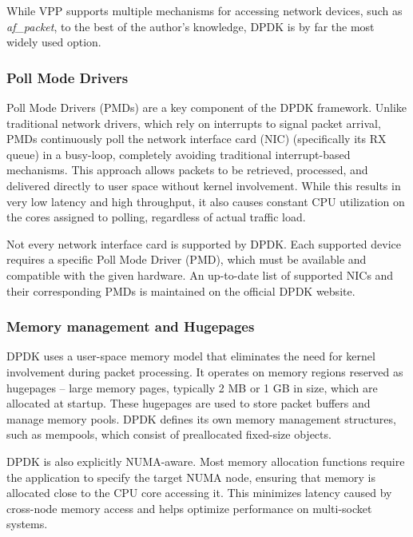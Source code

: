 While VPP supports multiple mechanisms for accessing network devices, such as \textit{af\_packet}, to the best of the author's knowledge, DPDK is by far the most widely used option.

\subsubsection{Poll Mode Drivers}
Poll Mode Drivers (PMDs) are a key component of the DPDK framework. Unlike traditional network drivers, which rely on interrupts to signal packet arrival, 
PMDs continuously poll the network interface card (NIC) (specifically its RX queue) in a busy-loop, completely avoiding traditional interrupt-based mechanisms. 
This approach allows packets to be retrieved, processed, and delivered directly to user space without kernel involvement. 
While this results in very low latency and high throughput, it also causes constant CPU utilization on the cores assigned to polling, regardless of actual traffic load.\cite{FREITAS2022148}

Not every network interface card is supported by DPDK. Each supported device requires a specific Poll Mode Driver (PMD), which must be available and compatible with the given hardware. 
An up-to-date list of supported NICs and their corresponding PMDs is maintained on the official DPDK website.\cite{dpdk-supported-nics}

\subsubsection{Memory management and Hugepages}
DPDK uses a user-space memory model that eliminates the need for kernel involvement during packet processing. 
It operates on memory regions reserved as hugepages -- large memory pages, typically 2 MB or 1 GB in size, which are allocated at startup. 
These hugepages are used to store packet buffers and manage memory pools. 
DPDK defines its own memory management structures, such as mempools, which consist of preallocated fixed-size objects. 

DPDK is also explicitly NUMA-aware. Most memory allocation functions require the application to specify the target NUMA node, ensuring that memory is allocated close to the CPU core accessing it. 
This minimizes latency caused by cross-node memory access and helps optimize performance on multi-socket systems.\cite{burakov2019memory}

